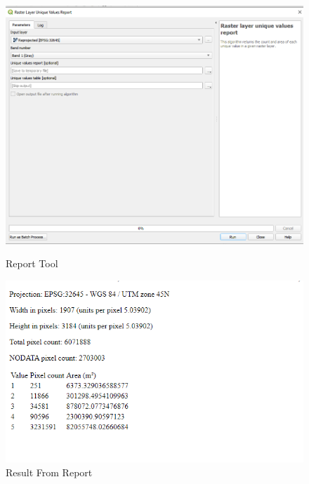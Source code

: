 \begin{figure}[hbtp]
  \centering
  \includegraphics[height=0.33\textheight]{images/gis/Report.png}
  \caption{Report Tool}
  \vfill
  \includegraphics[height=0.33\textheight]{images/gis/AreaSumReport.png}
  \caption{Result From Report}
\end{figure}
\pagebreak